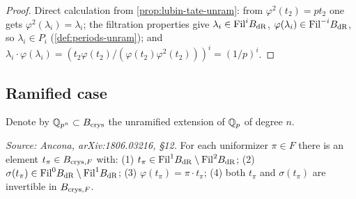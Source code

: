 \begin{proof}
  Direct calculation from \cref{prop:lubin-tate-unram}: from \(\varphi^2(t_2) =
  p t_2\) one gets \(\varphi^2(\lambda_i) = \lambda_i\); the filtration
  properties give \(\lambda_i \in \mathrm{Fil}^i B_{\mathrm{dR}}\), \(\varphi(\lambda_i) \in
  \mathrm{Fil}^{-i} B_{\mathrm{dR}}\), so \(\lambda_i \in P_i\) (\cref{def:periods-unram}); and
  \(\lambda_i \cdot \varphi(\lambda_i) = (t_2 \varphi(t_2)/(\varphi(t_2)
  \varphi^2(t_2)))^i = (1/p)^i\).
\end{proof}

\subsection*{Ramified case}

Denote by \(\mathbb{Q}_{p^n} \subset B_{\mathrm{crys}}\) the unramified extension of \(\mathbb{Q}_p\) of
degree \(n\).

\begin{proposition}
  \label{prop:lubin-tate-ram}
  \textit{Source: Ancona, arXiv:1806.03216, \S12.}
  For each uniformizer \(\pi \in F\) there is an element
  \(t_\pi \in B_{\mathrm{crys},F}\) with:
  (1) \(t_\pi \in \mathrm{Fil}^1 B_{\mathrm{dR}} \setminus \mathrm{Fil}^2 B_{\mathrm{dR}}\);
  (2) \(\sigma(t_\pi) \in \mathrm{Fil}^0 B_{\mathrm{dR}} \setminus \mathrm{Fil}^1 B_{\mathrm{dR}}\);
  (3) \(\varphi(t_\pi) = \pi \cdot t_\pi\);
  (4) both \(t_\pi\) and \(\sigma(t_\pi)\) are invertible in \(B_{\mathrm{crys},F}\).
\end{proposition}

